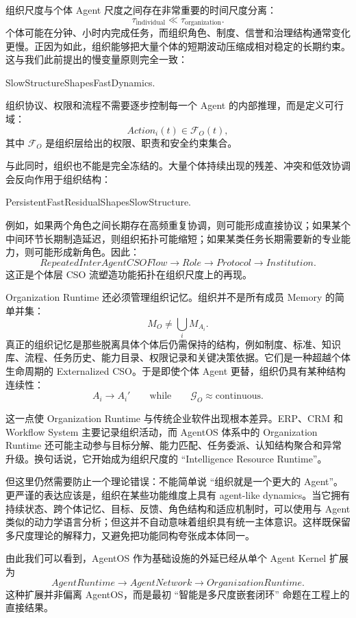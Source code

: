 组织尺度与个体 Agent 尺度之间存在非常重要的时间尺度分离：
\[
\tau_{\mathrm{individual}}
\ll
\tau_{\mathrm{organization}}.
\]
个体可能在分钟、小时内完成任务，而组织角色、制度、信誉和治理结构通常变化更慢。正因为如此，组织能够把大量个体的短期波动压缩成相对稳定的长期约束。这与我们此前提出的慢变量原则完全一致：
\begin{statementbox}
SlowStructureShapesFastDynamics.
\end{statementbox}
组织协议、权限和流程不需要逐步控制每一个 Agent 的内部推理，而是定义可行域：
\[
Action_i(t)\in\mathcal F_O(t),
\]
其中 $\mathcal F_O$ 是组织层给出的权限、职责和安全约束集合。

与此同时，组织也不能是完全冻结的。大量个体持续出现的残差、冲突和低效协调会反向作用于组织结构：
\begin{statementbox}
PersistentFastResidualShapesSlowStructure.
\end{statementbox}
例如，如果两个角色之间长期存在高频重复协调，则可能形成直接协议；如果某个中间环节长期制造延迟，则组织拓扑可能缩短；如果某类任务长期需要新的专业能力，则可能形成新角色。因此：
\[
RepeatedInterAgentCSOFlow
\rightarrow
Role
\rightarrow
Protocol
\rightarrow
Institution.
\]
这正是个体层 CSO 流塑造功能拓扑在组织尺度上的再现。

Organization Runtime 还必须管理组织记忆。组织并不是所有成员 Memory 的简单并集：
\[
M_O
\neq
\bigcup_i M_{A_i}.
\]
真正的组织记忆是那些脱离具体个体后仍需保持的结构，例如制度、标准、知识库、流程、任务历史、能力目录、权限记录和关键决策依据。它们是一种超越个体生命周期的 Externalized CSO。于是即使个体 Agent 更替，组织仍具有某种结构连续性：
\[
A_i\rightarrow A_i'
\qquad\text{while}\qquad
\mathcal G_O\approx\mathrm{continuous}.
\]

这一点使 Organization Runtime 与传统企业软件出现根本差异。ERP、CRM 和 Workflow System 主要记录组织活动，而 AgentOS 体系中的 Organization Runtime 还可能主动参与目标分解、能力匹配、任务委派、认知结构聚合和异常升级。换句话说，它开始成为组织尺度的 ``Intelligence Resource Runtime''。

但这里仍然需要防止一个理论错误：不能简单说 ``组织就是一个更大的 Agent''。更严谨的表达应该是，组织在某些功能维度上具有 agent-like dynamics。当它拥有持续状态、跨个体记忆、目标、反馈、角色结构和适应机制时，可以使用与 Agent 类似的动力学语言分析；但这并不自动意味着组织具有统一主体意识。这样既保留多尺度理论的解释力，又避免把功能同构夸张成本体同一。

由此我们可以看到，AgentOS 作为基础设施的外延已经从单个 Agent Kernel 扩展为
\[
AgentRuntime
\rightarrow
AgentNetwork
\rightarrow
OrganizationRuntime.
\]
这种扩展并非偏离 AgentOS，而是最初 ``智能是多尺度嵌套闭环'' 命题在工程上的直接结果。

